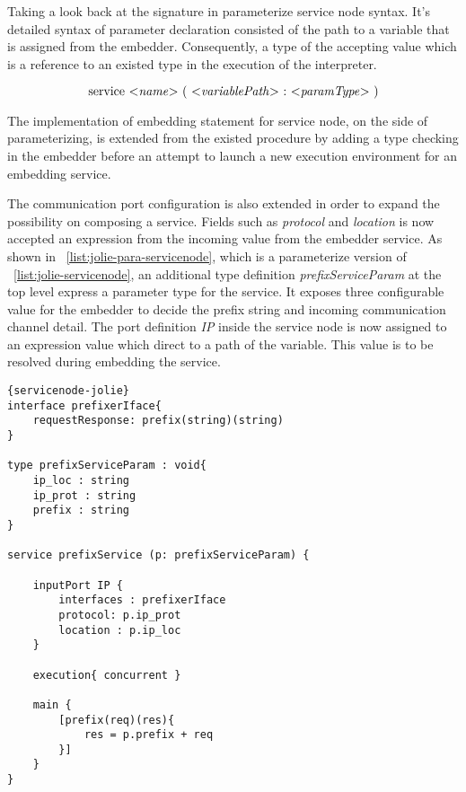 Taking a look back at the signature in parameterize service node syntax. It's detailed syntax of parameter declaration consisted of the path to a variable that is assigned from the embedder. Consequently, a type of the accepting value which is a reference to an existed type in the execution of the interpreter. 

\[
    \text{service $<$\textit{name}$>$ $($ $<$\textit{variablePath}$>$ $:$ $<$\textit{paramType}$>$ $)$} 
\]

The implementation of embedding statement for service node, on the side of parameterizing, is extended from the existed procedure by adding a type checking in the embedder before an attempt to launch a new execution environment for an embedding service.

The communication port configuration is also extended in order to expand the possibility on composing a service. Fields such as \textit{protocol} and \textit{location} is now accepted an expression from the incoming value from the embedder service. As shown in ~\ref{list:jolie-para-servicenode}, which is a parameterize version of ~\ref{list:jolie-servicenode}, an additional type definition \textit{prefixServiceParam} at the top level express a parameter type for the service. It exposes three configurable value for the embedder to decide the prefix string and incoming communication channel detail. The port definition \textit{IP} inside the service node is now assigned to an expression value which direct to a path of the variable. This value is to be resolved during embedding the service.

\begin{listing}[h]

    \lstset{language=Jolie,
        style=codeStyle,
        numbers=left,
        firstnumber=1
    }
    \begin{lstlisting}[frame=tlrb, caption= {Jolie Parameterize Service Node Example}, label={list:jolie-para-servicenode} ]{servicenode-jolie}
interface prefixerIface{
    requestResponse: prefix(string)(string)
}

type prefixServiceParam : void{
    ip_loc : string
    ip_prot : string
    prefix : string
}

service prefixService (p: prefixServiceParam) {
    
    inputPort IP {
        interfaces : prefixerIface
        protocol: p.ip_prot
        location : p.ip_loc
    }

    execution{ concurrent }

    main {
        [prefix(req)(res){
            res = p.prefix + req
        }]
    }
}
    \end{lstlisting}
\end{listing}


